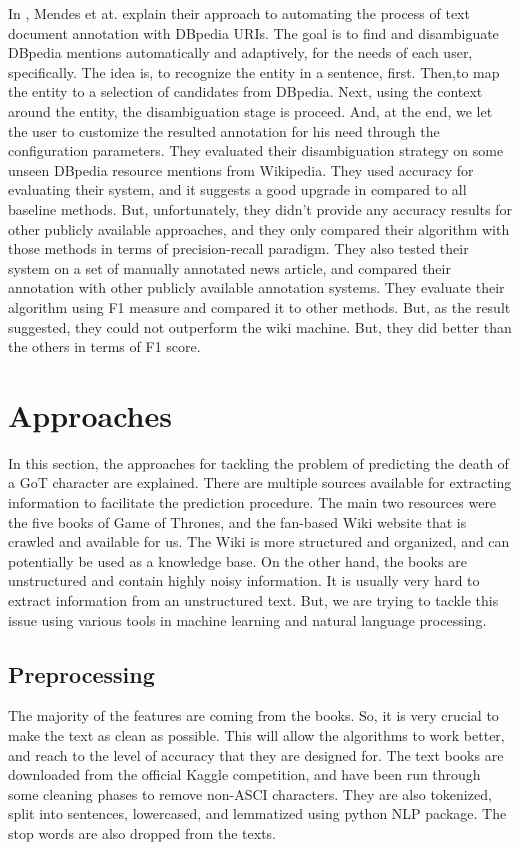 \documentclass[letterpaper]{article}
\begin{document}
In \cite{dbpedia}, Mendes et at. explain their approach to automating the process of text document annotation with DBpedia URIs. The goal is to find and disambiguate DBpedia mentions automatically and adaptively, for the needs of each user, specifically. The idea is, to recognize the entity in a sentence, first. Then,to map the entity to a selection of candidates from DBpedia. Next, using the context around the entity, the disambiguation stage is proceed. And, at the end, we let the user to customize the resulted annotation for his need through the configuration parameters. They evaluated their disambiguation strategy on some unseen DBpedia resource mentions from Wikipedia. They used accuracy for evaluating their system, and it suggests a good upgrade in compared to all baseline methods. But, unfortunately, they didn't provide any accuracy results for other publicly available approaches, and they only compared their algorithm with those methods in terms of precision-recall paradigm. They also tested their system on a set of manually annotated news article, and compared their annotation with other publicly available annotation systems. They evaluate their algorithm using F1 measure and compared it to other methods. But, as the result suggested, they could not outperform the wiki machine. But, they did better than the others in terms of F1 score.


\section{Approaches} \label{sec:approach}

In this section, the approaches for tackling the problem of predicting the death of a GoT character are explained. 
There are multiple sources available for extracting information to facilitate the prediction procedure. The main two resources were the five books of Game of Thrones, and the fan-based Wiki website that is crawled and available for us. The Wiki is more structured and organized, and can potentially be used as a knowledge base. On the other hand, the books are unstructured and contain highly noisy information. It is usually very hard to extract information from an unstructured text. But, we are trying to tackle this issue using various tools in machine learning and natural language processing.

\subsection{Preprocessing}
The majority of the features are coming from the books. So, it is very crucial to make the text as clean as possible. This will allow the algorithms to work better, and reach to the level of accuracy that they are designed for. The text books are downloaded from the official Kaggle competition, and have been run through some cleaning phases to remove non-ASCI characters. They are also tokenized, split into sentences, lowercased, and lemmatized using python NLP package. The stop words are also dropped from the texts. 
\end{document}
